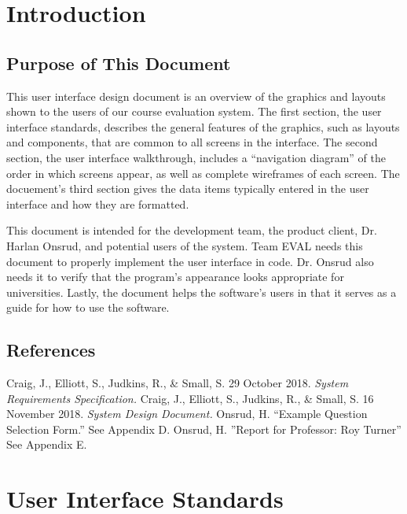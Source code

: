 \documentclass{article}
\begin{document}
\tableofcontents

\newpage

\section{Introduction}
 

\subsection{Purpose of This Document}

This user interface design document is an overview of the graphics and layouts shown to the users of our course evaluation system. The first section, the user interface standards, describes the general features of the graphics, such as layouts and components, that are common to all screens in the interface. The second section, the user interface walkthrough, includes a ``navigation diagram'' of the order in which screens appear, as well as complete wireframes of each screen. The docuement's third section gives the data items typically entered in the user interface and how they are formatted.

This document is intended for the development team, the product client, Dr. Harlan Onsrud, and potential users of the system. Team EVAL needs this document to properly implement the user interface in code. Dr. Onsrud also needs it to verify that the program's appearance looks appropriate for universities. Lastly, the document helps the software's users in that it serves as a guide for how to use the software.


\subsection{References}

Craig, J., Elliott, S., Judkins, R., \& Small, S. 29 October 2018. \textit{System Requirements Specification.}
\vspace{3mm}\newline
Craig, J., Elliott, S., Judkins, R., \& Small, S. 16 November 2018. \textit{System Design Document.}
\vspace{3mm}\newline
Onsrud, H. ``Example Question Selection Form.'' See Appendix D.
\vspace{3mm}\newline
Onsrud, H. ''Report for Professor: Roy Turner'' See Appendix E.

\section{User Interface Standards}
\end{document}

